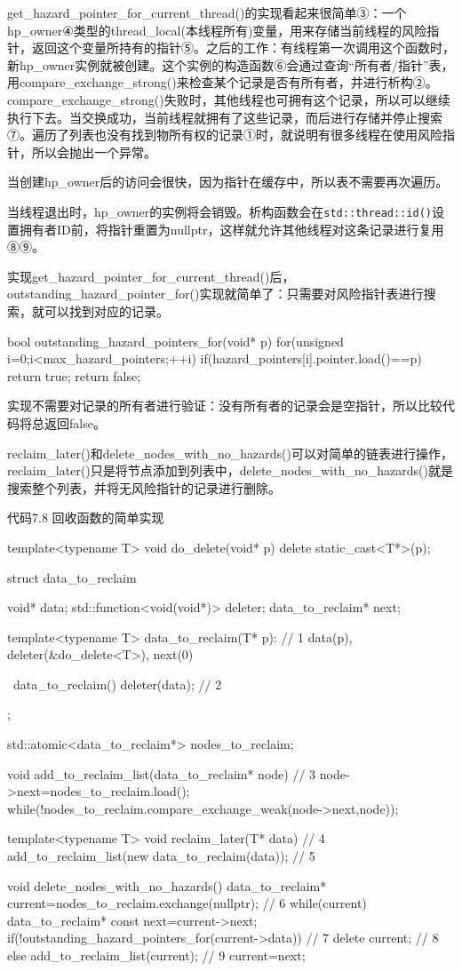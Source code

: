 get\_hazard\_pointer\_for\_current\_thread()的实现看起来很简单③：一个hp\_owner④类型的thread\_local(本线程所有)变量，用来存储当前线程的风险指针，返回这个变量所持有的指针⑤。之后的工作：有线程第一次调用这个函数时，新hp\_owner实例就被创建。这个实例的构造函数⑥会通过查询“所有者/指针”表，用compare\_exchange\_strong()来检查某个记录是否有所有者，并进行析构②。compare\_exchange\_strong()失败时，其他线程也可拥有这个记录，所以可以继续执行下去。当交换成功，当前线程就拥有了这些记录，而后进行存储并停止搜索⑦。遍历了列表也没有找到物所有权的记录①时，就说明有很多线程在使用风险指针，所以会抛出一个异常。

当创建hp\_owner后的访问会很快，因为指针在缓存中，所以表不需要再次遍历。

当线程退出时，hp\_owner的实例将会销毁。析构函数会在\texttt{std::thread::id()}设置拥有者ID前，将指针重置为nullptr，这样就允许其他线程对这条记录进行复用⑧⑨。

实现get\_hazard\_pointer\_for\_current\_thread()后，outstanding\_hazard\_pointer\_for()实现就简单了：只需要对风险指针表进行搜索，就可以找到对应的记录。

\begin{cpp}
bool outstanding_hazard_pointers_for(void* p)
{
  for(unsigned i=0;i<max_hazard_pointers;++i)
  {
    if(hazard_pointers[i].pointer.load()==p)
    {
      return true;
    }
  }
  return false;
}
\end{cpp}

实现不需要对记录的所有者进行验证：没有所有者的记录会是空指针，所以比较代码将总返回false。

reclaim\_later()和delete\_nodes\_with\_no\_hazards()可以对简单的链表进行操作，reclaim\_later()只是将节点添加到列表中，delete\_nodes\_with\_no\_hazards()就是搜索整个列表，并将无风险指针的记录进行删除。

代码7.8 回收函数的简单实现

\begin{cpp}
template<typename T>
void do_delete(void* p)
{
  delete static_cast<T*>(p);
}

struct data_to_reclaim
{
  void* data;
  std::function<void(void*)> deleter;
  data_to_reclaim* next;

  template<typename T>
  data_to_reclaim(T* p):  // 1
    data(p),
    deleter(&do_delete<T>),
    next(0)
  {}

  ~data_to_reclaim()
  {
    deleter(data);  // 2
  }
};

std::atomic<data_to_reclaim*> nodes_to_reclaim;

void add_to_reclaim_list(data_to_reclaim* node)  // 3
{
  node->next=nodes_to_reclaim.load();
  while(!nodes_to_reclaim.compare_exchange_weak(node->next,node));
}

template<typename T>
void reclaim_later(T* data)  // 4
{
  add_to_reclaim_list(new data_to_reclaim(data));  // 5
}

void delete_nodes_with_no_hazards()
{
  data_to_reclaim* current=nodes_to_reclaim.exchange(nullptr);  // 6
  while(current)
  {
    data_to_reclaim* const next=current->next;
    if(!outstanding_hazard_pointers_for(current->data))  // 7
    {
      delete current;  // 8
    }
    else
    {
      add_to_reclaim_list(current);  // 9
    }
    current=next;
  }
}
\end{cpp}

